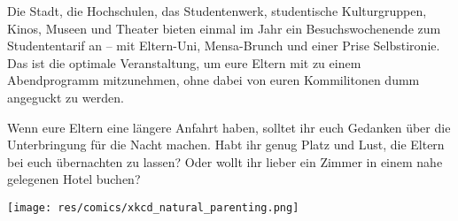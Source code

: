 \begin{multicols}{2}
Die Stadt, die Hochschulen, das Studentenwerk, studentische Kulturgruppen, Kinos, Museen und Theater bieten einmal im Jahr ein Besuchswochenende zum Studententarif an -- mit Eltern-Uni, Mensa-Brunch und einer Prise Selbstironie. Das ist die optimale Veranstaltung, um eure Eltern mit zu einem Abendprogramm mitzunehmen, ohne dabei von euren Kommilitonen dumm angeguckt zu werden.

Wenn eure Eltern eine längere Anfahrt haben, solltet ihr euch Gedanken über die Unterbringung für die Nacht machen. Habt ihr genug Platz und Lust, die Eltern bei euch übernachten zu lassen? Oder wollt ihr lieber ein Zimmer in einem nahe gelegenen Hotel buchen?

\end{multicols}

\medskip
\begin{center}
\texttt{[image: res/comics/xkcd\_natural\_parenting.png]}
\end{center}

